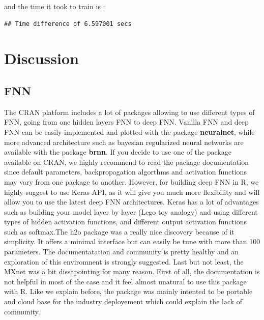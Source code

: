 \documentclass[letter,8pt]{article}\usepackage[]{graphicx}\usepackage[]{color}
\makeatletter
\newenvironment{kframe}{%
 \def\at@end@of@kframe{}%
 \ifinner\ifhmode%
  \def\at@end@of@kframe{\end{minipage}}%
  \begin{minipage}{\columnwidth}%
 \fi\fi%
 \def\FrameCommand##1{\hskip\@totalleftmargin \hskip-\fboxsep
 \colorbox{shadecolor}{##1}\hskip-\fboxsep
     \hskip-\linewidth \hskip-\@totalleftmargin \hskip\columnwidth}%
 \MakeFramed {\advance\hsize-\width
   \@totalleftmargin\z@ \linewidth\hsize
   \@setminipage}}%
 {\par\unskip\endMakeFramed%
 \at@end@of@kframe}
\newenvironment{knitrout}{}{} %
\makeatother
\begin{document}
and the time it took to train is :
\begin{knitrout}
\color{fgcolor}\begin{kframe}
\begin{verbatim}
## Time difference of 6.597001 secs
\end{verbatim}
\end{kframe}
\end{knitrout}


\section{Discussion}
\subsection{FNN}
The CRAN platform includes a lot of packages allowing to use different types of FNN, going from one hidden layers FNN to deep FNN. Vanilla FNN and deep FNN can be easily implemented and plotted with the package \textbf{neuralnet}, while more advanced architecture such as bayesian regularized neural networks are available with the package \textbf{brnn}. If you decide to use one of the package available on CRAN, we highly recommend to read the package documentation since default parameters, backpropagation algorthms and activation functions may vary from one package to another. However, for building deep FNN in R, we highly suggest to use Keras API, as it will give you much more flexibility and will allow you to use the latest deep FNN architectures. Keras has a lot of advantages such as building your model layer by layer (Lego toy analogy) and using different types of hidden activation functions, and different output activation functions such as softmax.The h2o package was a really nice discovery because of it simplicity. It offers a minimal interface but can easily be tune with more than 100 parameters. The documentatation and community is pretty healthy and an exploration of this enviromnent is strongly suggested. Last but not least, the MXnet was a bit dissapointing for many reason. First of all, the documentation is not helpful in most of the case and it feel almost unatural to use this package with R. Like we explain before, the package was mainly intented to be portable and cloud base for the industry deployement which could explain the lack of community.
\end{document}
